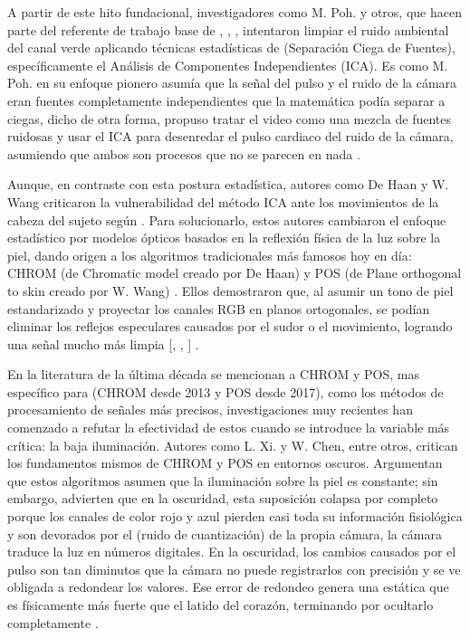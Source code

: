 A partir de este hito fundacional, investigadores como M. Poh. y otros, que hacen parte del referente de trabajo base de \cite{transphys2023}, \cite{yue2024facial_peak}, \cite{wu2026udarppg},  intentaron limpiar el ruido ambiental del canal verde aplicando técnicas estadísticas de 
(Separación Ciega de Fuentes), específicamente el Análisis de Componentes Independientes (ICA). Es como M. Poh. en su enfoque pionero asumía que la señal del pulso y el ruido de la 
cámara eran fuentes completamente independientes que la matemática podía separar a ciegas, dicho de otra forma, propuso tratar el video como una mezcla de fuentes ruidosas y usar el ICA para desenredar 
el pulso cardiaco del ruido de la cámara, asumiendo que ambos son procesos que no se parecen en nada \cite{transphys2023}.

Aunque, en contraste con esta postura estadística, autores como De Haan y W. Wang criticaron la vulnerabilidad del método ICA ante los movimientos 
de la cabeza del sujeto según \cite{transphys2023, yue2024facial_peak}. Para solucionarlo, estos autores cambiaron el enfoque estadístico por modelos ópticos basados en la reflexión física de la luz sobre la 
piel, dando origen a los algoritmos tradicionales más famosos hoy en día: CHROM (de Chromatic model creado por De Haan) y POS (de Plane orthogonal to skin creado por W. Wang) \cite{yang2022assessment_dl, yue2024facial_peak, kim2022study}. Ellos demostraron que, al asumir un tono de piel estandarizado y proyectar 
los canales RGB en planos ortogonales, se podían eliminar los reflejos especulares causados por el sudor o el movimiento, logrando una señal mucho más limpia [\cite{transphys2023}, \cite{wu2026udarppg}, \cite{yue2024facial_peak}] .

En la literatura de la última década se mencionan a CHROM y POS, mas específico para (CHROM desde 2013 y POS desde 2017), como los métodos de procesamiento de señales más precisos, investigaciones muy recientes han 
comenzado a refutar la efectividad de estos cuando se introduce la variable más crítica: la baja iluminación. Autores como L. Xi. y W. Chen, entre otros, critican 
los fundamentos mismos de CHROM y POS en entornos oscuros. Argumentan que estos algoritmos asumen que la iluminación sobre la piel es constante; sin embargo, 
advierten que en la oscuridad, esta suposición colapsa por completo porque los canales de color rojo y azul pierden casi toda su información fisiológica y son 
devorados por el (ruido de cuantización) de la propia cámara, la cámara traduce la luz en números digitales. En la oscuridad, los cambios causados por el pulso 
son tan diminutos que la cámara no puede registrarlos con precisión y se ve obligada a redondear los valores. Ese error de redondeo genera una estática 
que es físicamente más fuerte que el latido del corazón, terminando por ocultarlo completamente \cite{yang2022image_en, yang2022assessment_dl, xi2022weighted}.

